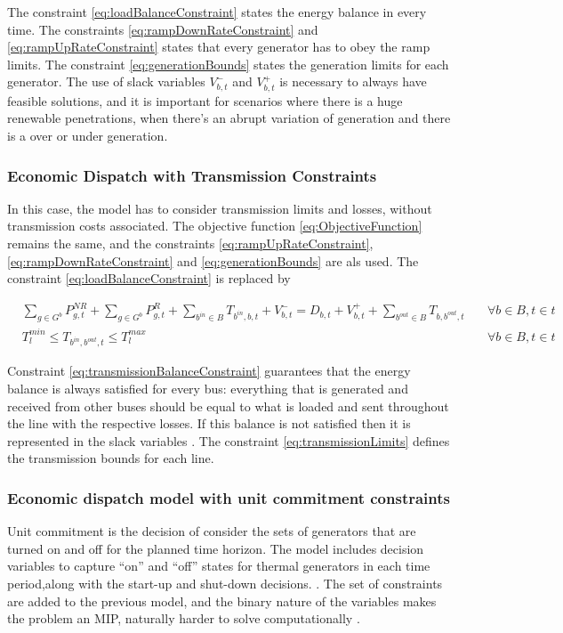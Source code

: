 \documentclass[12pt,LUDisStyle,twosided]{book}
\begin{document}
The constraint \ref{eq:loadBalanceConstraint} states the energy balance in every time. The constraints \ref{eq:rampDownRateConstraint} and \ref{eq:rampUpRateConstraint} states that every generator has to obey the ramp limits. The constraint \ref{eq:generationBounds} states the generation limits for each generator. The use of slack variables $V^{-}_{b,t}$ and $V^{+}_{b,t}$ is necessary to always have feasible solutions, and it is important for scenarios where there is a huge renewable penetrations, when there's an abrupt variation of generation and there is a over or under generation.   

\subsubsection{Economic Dispatch with Transmission Constraints}

In this case, the model has to consider transmission limits and losses, without transmission costs associated. The objective function \ref{eq:ObjectiveFunction} remains the same, and the constraints \ref{eq:rampUpRateConstraint}, \ref{eq:rampDownRateConstraint} and \ref{eq:generationBounds} are als used. The constraint \ref{eq:loadBalanceConstraint} is replaced by  

\begin{subequations}\label{model:edTransmissionConstraints}
\begin{alignat}{4}
&\sum_{g \in G^{b}} P^{NR}_{g,t} + \sum_{g \in G^{b}} P^{R}_{g,t} + \sum_{b^{in} \in B} T_{b^{in},b,t} + V^{-}_{b,t} = D_{b,t}  + V^{+}_{b,t} + \sum_{b^{out} \in B} T_{b,b^{out},t}  &~& \forall b \in B, t \in t \label{eq:transmissionBalanceConstraint} \\
& T^{min}_{l} \leq T_{b^{in},b^{out},t} \leq T^{max}_{l}  &~& \forall b \in B, t \in t \label{eq:transmissionLimits}
\end{alignat} 
\end{subequations}

Constraint \ref{eq:transmissionBalanceConstraint} guarantees that the energy balance is always satisfied for every bus: everything that is generated and received from other buses should be equal to what is loaded and sent throughout the line with the respective losses. If this balance is not satisfied then it is represented in the slack variables . The constraint \ref{eq:transmissionLimits} defines the transmission bounds for each line.

\subsubsection{Economic dispatch model with unit commitment constraints}
Unit commitment is the decision of consider the sets of generators that are turned on and off for the planned time horizon. The model includes decision variables to capture ``on'' and ``off'' states for thermal generators in each time period,along with the start-up and shut-down decisions. \citep{palmintier}. The set of constraints are added to the previous model, and the binary nature of the variables makes the problem an MIP, naturally harder to solve computationally \cite{james}. 
\end{document}
